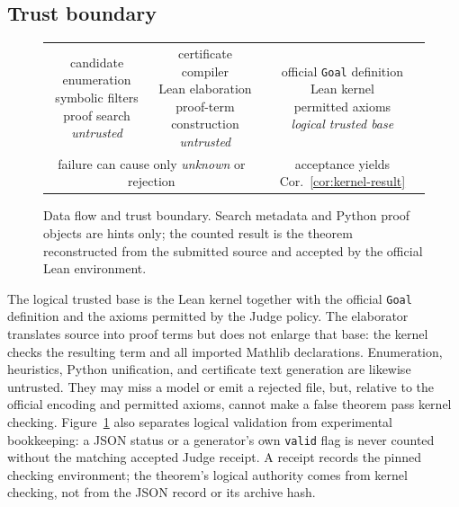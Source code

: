 \documentclass[runningheads]{llncs}
\newcommand{\Lean}{\textsc{Lean}}
\begin{document}
\subsection{Trust boundary}

\begin{figure}[!htbp]
\centering
\small
\setlength{\tabcolsep}{3pt}
\begin{tabular}{@{}c@{\(\longrightarrow\)}c@{\(\Longrightarrow\)}c@{}}
\fbox{\parbox{0.25\linewidth}{\centering
 candidate enumeration\\symbolic filters\\proof search\\\emph{untrusted}}}
&
\fbox{\parbox{0.25\linewidth}{\centering
 certificate compiler\\Lean elaboration\\proof-term construction\\\emph{untrusted}}}
&
\fbox{\parbox{0.29\linewidth}{\centering
 official \texttt{Goal} definition\\Lean kernel\\permitted axioms\\
 \emph{logical trusted base}}}
\\[4pt]
\multicolumn{2}{c}{failure can cause only \emph{unknown} or rejection}
&
acceptance yields Cor.~\ref{cor:kernel-result}
\end{tabular}
\caption{Data flow and trust boundary.  Search metadata and Python proof
objects are hints only; the counted result is the theorem reconstructed from
the submitted source and accepted by the official Lean environment.}
\label{fig:trust-boundary}
\end{figure}

The logical trusted base is the Lean kernel together with the official
\texttt{Goal} definition and the axioms permitted by the Judge policy.  The
elaborator translates source into proof terms but does not enlarge that base:
the kernel checks the resulting term and all imported Mathlib declarations.
Enumeration, heuristics, Python unification, and certificate text generation
are likewise untrusted.  They may miss a model or emit a rejected file, but,
relative to the official encoding and permitted axioms, cannot make a false
theorem pass kernel checking.  Figure~\ref{fig:trust-boundary} also separates
logical validation from experimental bookkeeping: a JSON status or a
generator's own \texttt{valid} flag is never counted without the matching
accepted Judge receipt.  A receipt records the pinned checking environment;
the theorem's logical authority comes from kernel checking, not from the JSON
record or its archive hash.
\end{document}
